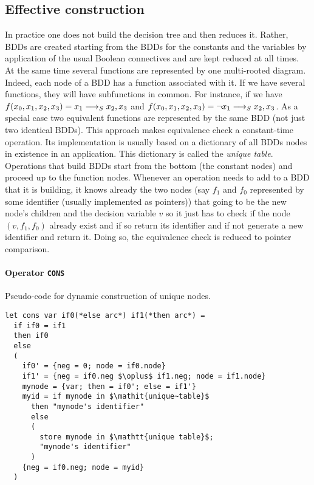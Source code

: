 \documentclass[a4paper,10pt]{article}
\begin{document}
\subsection{Effective construction}
In practice one does not build the decision tree and then reduces it.
Rather, BDDs are created starting from the BDDs for the constants and the variables by application of the usual Boolean connectives and are kept reduced at all times.
At the same time several functions are represented by one multi-rooted diagram.
Indeed, each node of a BDD has a function associated with it.
If we have several functions, they will have subfunctions in common.
For instance, if we have $f(x_0, x_1, x_2, x_3) = x_1 \longrightarrow_S x_2, x_3$ and $f(x_0, x_1, x_2, x_3) = \lnot x_1 \longrightarrow_S x_2, x_3$. As a special case two equivalent functions are represented by the same BDD (not just two identical BDDs).
This approach makes equivalence check a constant-time operation.
Its implementation is usually based on a dictionary of all BDDs nodes in existence in an application.
This dictionary is called the \textit{unique table}.
Operations that build BDDs start from the bottom (the constant nodes) and proceed up to the function nodes.
Whenever an operation needs to add to a BDD that it is building, it knows already the two nodes (say $f_1$ and $f_0$ represented by some identifier (usually implemented as pointers)) that going to be the new node's children and the decision variable $v$ so it just has to check if the node $(v, f_1, f_0)$ already exist and if so return its identifier and if not generate a new identifier and return it.
Doing so, the equivalence check is reduced to pointer comparison.

\paragraph{Operator \texttt{CONS}\\}


Pseudo-code for dynamic construction of unique nodes.

\begin{lstlisting}
let cons var if0(*else arc*) if1(*then arc*) =
  if if0 = if1
  then if0
  else
  (
    if0' = {neg = 0; node = if0.node}
    if1' = {neg = if0.neg $\oplus$ if1.neg; node = if1.node}
    mynode = {var; then = if0'; else = if1'}
    myid = if mynode in $\mathit{unique~table}$
      then "mynode's identifier"
      else
      (
        store mynode in $\mathtt{unique table}$;
        "mynode's identifier"
      )
    {neg = if0.neg; node = myid}
  )
\end{lstlisting}
\end{document}
